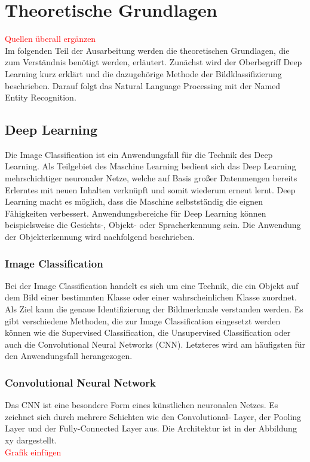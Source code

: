 \newpage
\section{Theoretische Grundlagen}
\textcolor{red}{Quellen überall ergänzen} \\
Im folgenden Teil der Ausarbeitung werden die theoretischen Grundlagen, die zum Verständnis benötigt werden, erläutert.
Zunächst wird der Oberbegriff Deep Learning kurz erklärt und die dazugehörige Methode der Bildklassifizierung beschrieben. Darauf folgt das Natural Language Processing mit der Named Entity Recognition.


\subsection{Deep Learning}

Die Image Classification ist ein Anwendungsfall für die Technik des Deep Learning.
Als Teilgebiet des Maschine Learning bedient sich das Deep Learning mehrschichtiger neuronaler Netze, welche auf Basis großer Datenmengen bereits Erlerntes mit neuen Inhalten verknüpft und somit wiederum erneut lernt. Deep Learning macht es möglich, dass die Maschine selbstständig die eignen Fähigkeiten verbessert.
Anwendungsbereiche für Deep Learning können beispielsweise die Gesichts-, Objekt- oder Spracherkennung sein. Die Anwendung der Objekterkennung wird nachfolgend beschrieben.

\subsubsection{Image Classification}
Bei der Image Classification handelt es sich um eine Technik, die ein Objekt auf dem Bild einer bestimmten Klasse oder einer wahrscheinlichen Klasse zuordnet. Als Ziel kann die genaue Identifizierung der Bildmerkmale verstanden werden.
Es gibt verschiedene Methoden, die zur Image Classification eingesetzt werden können wie die Supervised Classification, die Unsupervised Classification oder auch die Convolutional Neural Networks (CNN). Letzteres wird am häufigsten für den Anwendungsfall herangezogen.

\subsubsection{Convolutional Neural Network}
Das CNN ist eine besondere Form eines künstlichen neuronalen Netzes.
Es zeichnet sich durch mehrere Schichten wie den Convolutional- Layer, der Pooling Layer und der Fully-Connected Layer aus. Die Architektur ist in der Abbildung xy dargestellt.
\\
\textcolor{red}{Grafik einfügen} \\

